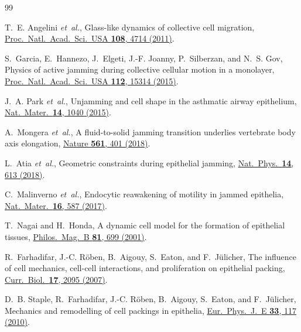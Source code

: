 \documentclass[aps,pre,twocolumn,superscriptaddress,longbibliography,floatfix]{revtex4-2}
\begin{document}
\begin{thebibliography}{99}

T.~E. Angelini \textit{et~al.},
Glass-like dynamics of collective cell migration,
\href{https://doi.org/10.1073/pnas.1010059108}{Proc.\ Natl.\ Acad.\ Sci.\
USA \textbf{108}, 4714 (2011)}.

S.~Garcia, E.~Hannezo, J.~Elgeti, J.-F. Joanny, P.~Silberzan, and
N.~S. Gov,
Physics of active jamming during collective cellular motion in a
monolayer,
\href{https://doi.org/10.1073/pnas.1510973112}{Proc.\ Natl.\ Acad.\ Sci.\
USA \textbf{112}, 15314 (2015)}.

J.~A. Park \textit{et~al.},
Unjamming and cell shape in the asthmatic airway epithelium,
\href{https://doi.org/10.1038/nmat4357}{Nat.\ Mater.\ \textbf{14}, 1040
(2015)}.

A.~Mongera \textit{et~al.},
A fluid-to-solid jamming transition underlies vertebrate body axis
elongation,
\href{https://doi.org/10.1038/s41586-018-0479-2}{Nature \textbf{561}, 401
(2018)}.

L.~Atia \textit{et~al.},
Geometric constraints during epithelial jamming,
\href{https://doi.org/10.1038/s41567-018-0089-9}{Nat.\ Phys.\ \textbf{14},
613 (2018)}.

C.~Malinverno \textit{et~al.},
Endocytic reawakening of motility in jammed epithelia,
\href{https://doi.org/10.1038/nmat4848}{Nat.\ Mater.\ \textbf{16}, 587
(2017)}.

T.~Nagai and H.~Honda,
A dynamic cell model for the formation of epithelial tissues,
\href{https://doi.org/10.1080/13642810108205772}{Philos.\ Mag.\ B
\textbf{81}, 699 (2001)}.

R.~Farhadifar, J.-C. R\"oben, B.~Aigouy, S.~Eaton, and F.~J\"ulicher,
The influence of cell mechanics, cell-cell interactions, and
proliferation on epithelial packing,
\href{https://doi.org/10.1016/j.cub.2007.11.049}{Curr.\ Biol.\
\textbf{17}, 2095 (2007)}.

\bibitem{Staple2010}
D.~B. Staple, R.~Farhadifar, J.-C. R\"oben, B.~Aigouy, S.~Eaton, and
F.~J\"ulicher,
Mechanics and remodelling of cell packings in epithelia,
\href{https://doi.org/10.1140/epje/i2010-10677-0}{Eur.\ Phys.\ J.\ E
\textbf{33}, 117 (2010)}.


\end{thebibliography}
\end{document}
